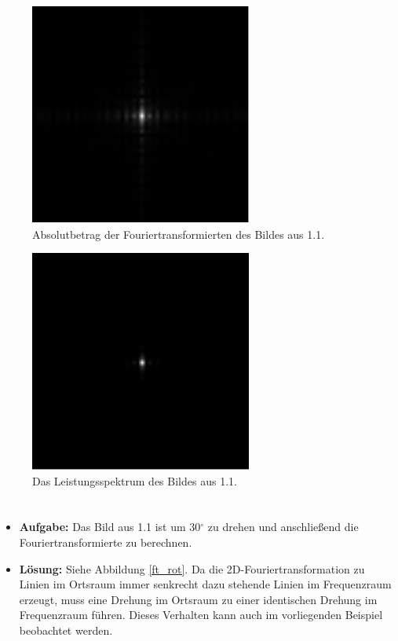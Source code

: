 \documentclass[12pt, a4paper, twoside]{report}
\begin{document}
\begin{figure}[h]
\centering
\includegraphics[width=0.65\textwidth]{../bilder/ft.png}
\caption{Absolutbetrag der Fouriertransformierten des Bildes aus 1.1.}
\label{ft}
\end{figure}

\begin{figure}[h]
\centering
\includegraphics[width=0.65\textwidth]{../bilder/leistungsspektrum.png}
\caption{Das Leistungsspektrum des Bildes aus 1.1.}
\label{leistung}
\end{figure}

\section{}
\begin{itemize}
\item \textbf{Aufgabe:} Das Bild aus 1.1 ist um 30$^\circ$ zu drehen und anschließend die Fouriertransformierte zu berechnen.
\item \textbf{Lösung:} Siehe Abbildung \ref{ft_rot}. Da die 2D-Fouriertransformation zu Linien im Ortsraum immer senkrecht dazu stehende Linien im Frequenzraum erzeugt, muss eine Drehung im Ortsraum zu einer identischen Drehung im Frequenzraum führen. Dieses Verhalten kann auch im vorliegenden Beispiel beobachtet werden.
\end{itemize}
\end{document}

